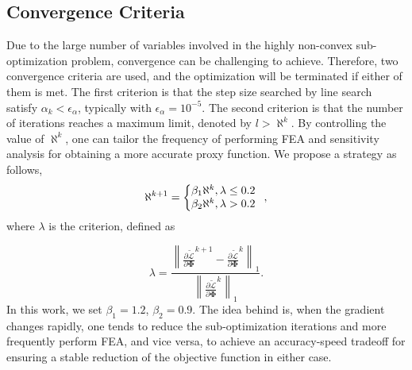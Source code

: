 \documentclass[journal]{IEEEtran}
\renewcommand{\vec}[1]{\mathbf{#1}}
\theoremstyle{definition}
\renewcommand{\vec}[1]{\mathbf{#1}}
\begin{document}
\subsection{Convergence Criteria}
Due to the large number of variables involved in the highly non-convex sub-optimization problem, convergence can be challenging to achieve. Therefore, two convergence criteria are used, and the optimization will be terminated if either of them is met. The first criterion is that the step size searched by line search satisfy $\alpha_k < \epsilon_\alpha$, typically with $\epsilon_\alpha = 10^{-5}$. The second criterion is that the number of iterations reaches a maximum limit, denoted by $l > \aleph^k$. By controlling the value of $\aleph^k$, one can tailor the frequency of performing FEA and sensitivity analysis for obtaining a more accurate proxy function. We propose a strategy as follows,
\begin{equation}
  \aleph^{k+1}=\left\{
  \begin{array}{@{}l@{}l}
     & \beta_1 \aleph^k, \lambda\leq0.2 \\
     & \beta_2 \aleph^k, \lambda>0.2
  \end{array}
  \right.
  ,
\end{equation}
where $\lambda$ is the criterion, defined as

\begin{equation}
  \lambda = \frac{\left\|\frac{\partial\tilde{\mathcal{L}}}{\partial \vec{\Phi}}^{k+1} - \frac{\partial\tilde{\mathcal{L}}}{\partial \vec{\Phi}}^{k}\right\|_1}{\left\|\frac{\partial\tilde{\mathcal{L}}}{\partial \vec{\Phi}}^{k}\right\|_1}.
\end{equation}
In this work, we set $\beta_1=1.2$, $\beta_2=0.9$. The idea behind is, when the gradient changes rapidly, one tends to reduce the sub-optimization iterations and more frequently perform FEA, and vice versa, to achieve an accuracy-speed tradeoff for ensuring a stable reduction of the objective function in either case.


\end{document}
